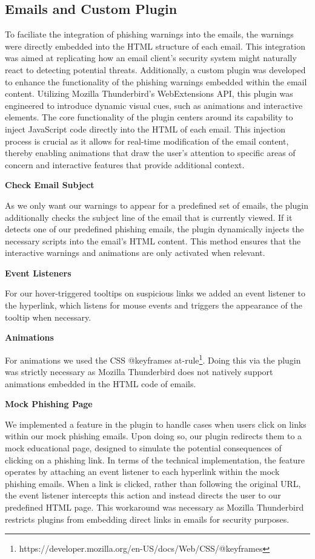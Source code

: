 \documentclass[
  a4paper,  %
  twoside,  %
  bibliography=totoc,
  headsepline,
  cleardoublepage=empty,
  parskip=half,
  draft=false
]{scrbook}
\begin{document}
\subsection{Emails and Custom Plugin}
To faciliate the integration of phishing warnings into the emails, the warnings were directly embedded into the HTML structure of each email. This integration was aimed at replicating how an email client's security system might naturally react to detecting potential threats.\newline
Additionally, a custom plugin was developed to enhance the functionality of the phishing warnings embedded within the email content. Utilizing Mozilla Thunderbird's WebExtensions API, this plugin was engineered to introduce dynamic visual cues, such as animations and interactive elements.
The core functionality of the plugin centers around its capability to inject JavaScript code directly into the HTML of each email. This injection process is crucial as it allows for real-time modification of the email content, thereby enabling animations that draw the user's attention to specific areas of concern and interactive features that provide additional context.

\textbf{Check Email Subject}

As we only want our warnings to appear for a predefined set of emails, the plugin additionally checks the subject line of the email that is currently viewed. If it detects one of our predefined phishing emails, the plugin dynamically injects the necessary scripts into the email's HTML content. This method ensures that the interactive warnings and animations are only activated when relevant. 

\textbf{Event Listeners}

For our hover-triggered tooltips on suspicious links we added an event listener to the hyperlink, which listens for mouse events and triggers the appearance of the tooltip when necessary.

\textbf{Animations}

For animations we used the CSS @keyframes at-rule\footnote{https://developer.mozilla.org/en-US/docs/Web/CSS/@keyframes}. Doing this via the plugin was strictly necessary as Mozilla Thunderbird does not natively support animations embedded in the HTML code of emails. 

\textbf{Mock Phishing Page}

We implemented a feature in the plugin to handle cases when users click on links within our mock phishing emails. Upon doing so, our plugin redirects them to a mock educational page, designed to simulate the potential consequences of clicking on a phishing link. In terms of the technical implementation, the feature operates by attaching an event listener to each hyperlink within the mock phishing emails. When a link is clicked, rather than following the original URL, the event listener intercepts this action and instead directs the user to our predefined HTML page. This workaround was necessary as Mozilla Thunderbird restricts plugins from embedding direct links in emails for security purposes.
\end{document}
